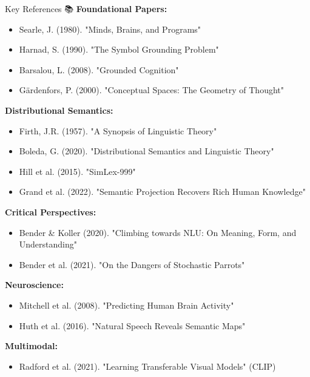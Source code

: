 \documentclass[aspectratio=169]{beamer}
\begin{document}
\begin{frame}[shrink=10]{Key References 📚}
\small
\textbf{Foundational Papers:}
\begin{itemize}\setlength{\itemsep}{0pt}
    \item Searle, J. (1980). "Minds, Brains, and Programs"
    \item Harnad, S. (1990). "The Symbol Grounding Problem"
    \item Barsalou, L. (2008). "Grounded Cognition"
    \item Gärdenfors, P. (2000). "Conceptual Spaces: The Geometry of Thought"
\end{itemize}

\vspace{0.3em}
\textbf{Distributional Semantics:}
\begin{itemize}\setlength{\itemsep}{0pt}
    \item Firth, J.R. (1957). "A Synopsis of Linguistic Theory"
    \item Boleda, G. (2020). "Distributional Semantics and Linguistic Theory"
    \item Hill et al. (2015). "SimLex-999"
    \item Grand et al. (2022). "Semantic Projection Recovers Rich Human Knowledge"
\end{itemize}

\vspace{0.3em}
\textbf{Critical Perspectives:}
\begin{itemize}\setlength{\itemsep}{0pt}
    \item Bender \& Koller (2020). "Climbing towards NLU: On Meaning, Form, and Understanding"
    \item Bender et al. (2021). "On the Dangers of Stochastic Parrots"
\end{itemize}

\vspace{0.3em}
\textbf{Neuroscience:}
\begin{itemize}\setlength{\itemsep}{0pt}
    \item Mitchell et al. (2008). "Predicting Human Brain Activity"
    \item Huth et al. (2016). "Natural Speech Reveals Semantic Maps"
\end{itemize}

\vspace{0.3em}
\textbf{Multimodal:}
\begin{itemize}\setlength{\itemsep}{0pt}
    \item Radford et al. (2021). "Learning Transferable Visual Models" (CLIP)
\end{itemize}
\end{frame}
\end{document}
